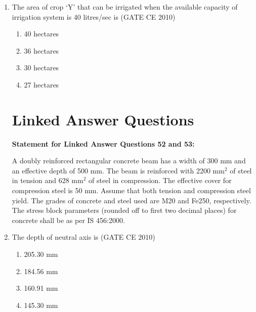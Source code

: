 \documentclass[journal]{IEEEtran}
\begin{document}
\begin{enumerate}
    
    \item The area of crop `Y' that can be irrigated when the available capacity of irrigation system is 40 litres/sec is \hfill (GATE CE 2010)

    \begin{multicols}{4}
        \begin{enumerate}
            \item 40 hectares
            \item 36 hectares
            \item 30 hectares
            \item 27 hectares
        \end{enumerate}
    \end{multicols}

    \section*{Linked Answer Questions}

    \textbf{Statement for Linked Answer Questions 52 and 53:}

    A doubly reinforced rectangular concrete beam has a width of 300 mm and an effective depth of 500 mm. The beam is reinforced with 2200 mm$^2$ of steel in tension and 628 mm$^2$ of steel in compression. The effective cover for compression steel is 50 mm. Assume that both tension and compression steel yield. The grades of concrete and steel used are M20 and Fe250, respectively. The stress block parameters (rounded off to first two decimal places) for concrete shall be as per IS 456:2000.\\

    \item The depth of neutral axis is \hfill (GATE CE 2010)
    \begin{multicols}{4}
        \begin{enumerate}
            \item 205.30 mm
            \item 184.56 mm
            \item 160.91 mm
            \item 145.30 mm
        \end{enumerate}
    \end{multicols}

\end{enumerate}
\end{document}
